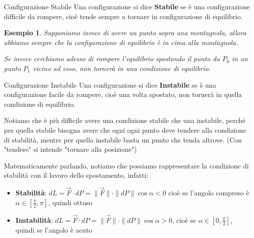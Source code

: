 \documentclass[11pt,a4paper,twoside]{article}
\newtheorem{es}{Esempio}
\theoremstyle{definition}
\begin{document}
\begin{defn}{Configurazione Stabile}{}
	Una configurazione si dice \textbf{Stabile} se è una configurazione difficile da rompere, cioè tende sempre a tornare in configurazione di equilibrio.
\end{defn}

\begin{es}
	Supponiamo invece di avere un punto sopra una montagnola, allora abbiamo sempre che la configurazione di equilibrio è in cima alla montagnola.
	\begin{center}
	\end{center}
	Se invece cerchiamo adesso di rompere l'equilibrio spostando il punto da $P_0$ in un punto $P_1$ vicino ad esso, non tornerà in una condizione di equilibrio.
	\begin{center}
	\end{center}
\end{es}

\begin{defn}{Configurazione Instabile}{}
	Una configurazione si dice \textbf{Instabile} se è una configurazione facile da rompere, cioè una volta spostato, non tornerà in quella condizione di equilibrio.
\end{defn}

Notiamo che è più difficile avere una condizione stabile che una instabile, perché per quella stabile bisogna avere che ogni ogni punto deve tendere alla condizione di stabilità, mentre per quella instabile basta un punto che tenda altrove.
(Con "tendere" si intende "tornare alla posizione")

Matematicamente parlando, notiamo che possiamo rappresentare la condizione di stabilità con il lavoro dello spostamento, infatti:
\begin{itemize}
	\item \textbf{Stabilità}: $dL = \vec F \cdot dP = \|\vec F\| \cdot \|dP\| \cos \alpha <0$ cioè se l'angolo compreso è $\alpha \in[\frac \pi2, \pi]$, quindi ottuso
	\item \textbf{Instabilità}: $dL = \vec F \cdot dP = \|\vec F\| \cdot \|dP\| \cos \alpha >0$, cioè se $\alpha \in [0, \frac \pi2]$, quindi se l'angolo è acuto
\end{itemize}
\end{document}
